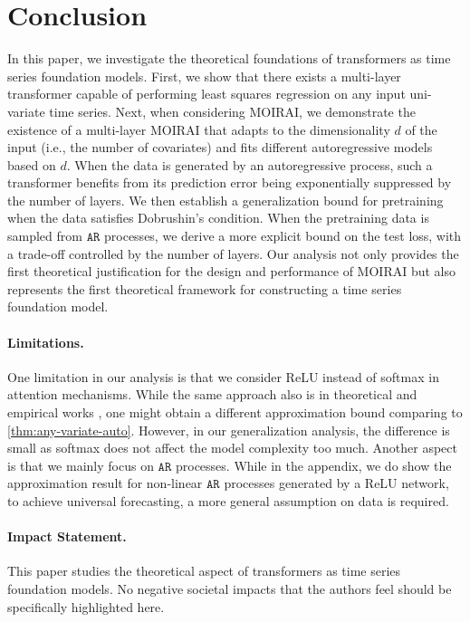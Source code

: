 \section{Conclusion}
In this paper, we investigate the theoretical foundations of transformers as time series foundation models.
First, we show that there exists a multi-layer transformer capable of performing least squares regression on any input uni-variate time series.
Next, when considering MOIRAI, we demonstrate the existence of a multi-layer MOIRAI that adapts to the dimensionality $d$ of the input (i.e., the number of covariates) and fits different autoregressive models based on $d$.
When the data is generated by an autoregressive process, such a transformer benefits from its prediction error being exponentially suppressed by the number of layers.
We then establish a generalization bound for pretraining when the data satisfies Dobrushin's condition.
When the pretraining data is sampled from $\mathtt{AR}$ processes, we derive a more explicit bound on the test loss, with a trade-off controlled by the number of layers.
Our analysis not only provides the first theoretical justification for the design and performance of MOIRAI but also represents the first theoretical framework for constructing a time series foundation model.

\paragraph{Limitations.}
One limitation in our analysis is that we consider ReLU instead of softmax in attention mechanisms.
While the same approach also is in theoretical \cite{bai2024transformers, lin2023transformers, he2025learning} and empirical works \cite{wortsman2023replacing, zhang2021sparse, shen2023study}, one might obtain a different approximation bound comparing to \cref{thm:any-variate-auto}.
However, in our generalization analysis, the difference is small as softmax does not affect the model complexity too much.
Another aspect is that we mainly focus on $\mathtt{AR}$ processes.
While in the appendix, we do show the approximation result for non-linear $\mathtt{AR}$ processes generated by a ReLU network, to achieve universal forecasting, a more general assumption on data is required.

\paragraph{Impact Statement.}
This paper studies the theoretical aspect of transformers as time series foundation models.
No negative societal impacts that the authors feel should be specifically highlighted here.